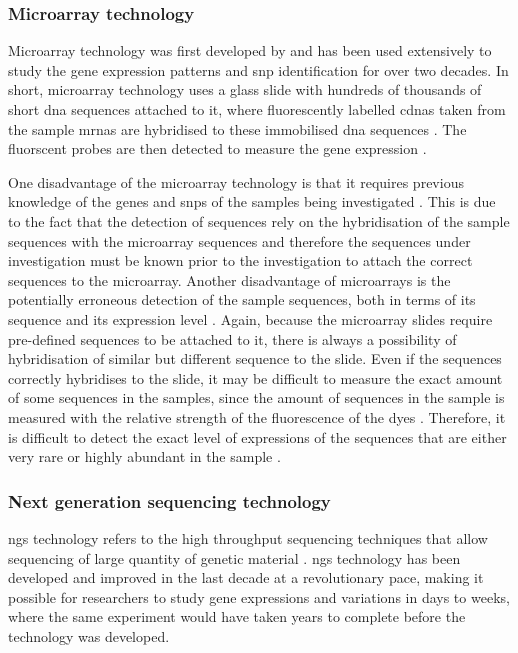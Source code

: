 \subsubsection{Microarray technology}
\label{ssub:microarray_technology}

Microarray technology was first developed by \citet{Schena1995} and has been used extensively to study the gene expression patterns and \gls{snp} identification for over two decades.
In short, microarray technology uses a glass slide with hundreds of thousands of short \acrshort{dna} sequences attached to it, where fluorescently labelled \glspl{cdna} taken from the sample \glspl{mrna} are hybridised to these immobilised \acrshort{dna} sequences \citep{Schena1995,Schulze2001}.
The fluorscent probes are then detected to measure the gene expression \citep{Schena1995,Schulze2001}.

One disadvantage of the microarray technology is that it requires previous knowledge of the genes and \glspl{snp} of the samples being investigated \citep{Hurd2009}.
This is due to the fact that the detection of sequences rely on the hybridisation of the sample sequences with the microarray sequences and therefore the sequences under investigation must be known prior to the investigation to attach the correct sequences to the microarray.
Another disadvantage of microarrays is the potentially erroneous detection of the sample sequences, both in terms of its sequence and its expression level \citep{Hurd2009}.
Again, because the microarray slides require pre-defined sequences to be attached to it, there is always a possibility of hybridisation of similar but different sequence to the slide.
Even if the sequences correctly hybridises to the slide, it may be difficult to measure the exact amount of some sequences in the samples, since the amount of sequences in the sample is measured with the relative strength of the fluorescence of the dyes \citep{Hurd2009}.
Therefore, it is difficult to detect the exact level of expressions of the sequences that are either very rare or highly abundant in the sample \citep{Hurd2009}.

\subsubsection{Next generation sequencing technology}
\label{ssub:next_generation_sequencing_technology}

\Gls{ngs} technology refers to the high throughput sequencing techniques that allow sequencing of large quantity of genetic material \citep{Metzker2010}.
\gls{ngs} technology has been developed and improved in the last decade at a revolutionary pace, making it possible for researchers to study gene expressions and variations in days to weeks, where the same experiment would have taken years to complete before the technology was developed.

